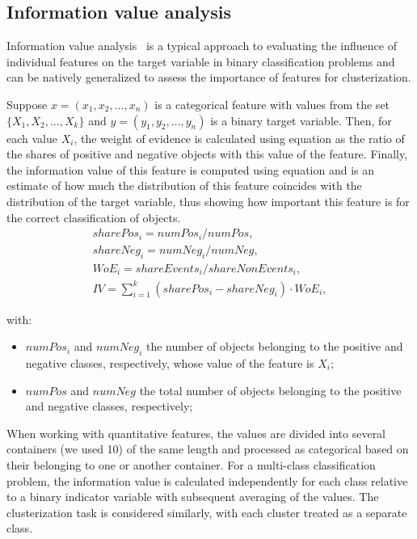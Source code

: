 \documentclass[10pt]{iopart}
\begin{document}
\subsection{Information value analysis}

Information value analysis~\cite{InformationValue} is a typical approach to evaluating the influence of individual features on the target variable in binary classification problems and can be natively generalized to assess the importance of features for clusterization.

Suppose $x=(x_1, x_2, \ldots, x_n)$ is a categorical feature with values from the set $\{ X_1, X_2, \ldots, X_k \}$ and $y=(y_1, y_2, \ldots, y_n)$ is a binary target variable. Then, for each value $X_i$, the weight of evidence is calculated using equation  as the ratio of the shares of positive and negative objects with this value of the feature. Finally, the information value of this feature is computed using equation  and is an estimate of how much the distribution of this feature coincides with the distribution of the target variable, thus showing how important this feature is for the correct classification of objects.
\begin{eqnarray}
    sharePos_i = numPos_i / numPos, \nonumber\\
    shareNeg_i = numNeg_i / numNeg, \nonumber\\
    WoE_i = shareEvents_i / shareNonEvents_i, \label{eq2}\\
    IV = \sum_{i = 1}^{k} (sharePos_i - shareNeg_i) \cdot WoE_i, \label{eq3}
\end{eqnarray}

with:
\begin{itemize}
    \item
        $numPos_i$ and $numNeg_i$ the number of objects belonging to the positive and negative classes, respectively, whose value of the feature is $X_i$;
    \item
        $numPos$ and $numNeg$ the total number of objects belonging to the positive and negative classes, respectively;
\end{itemize}

When working with quantitative features, the values are divided into several containers (we used 10) of the same length and processed as categorical based on their belonging to one or another container. For a multi-class classification problem, the information value is calculated independently for each class relative to a binary indicator variable with subsequent averaging of the values. The clusterization task is considered similarly, with each cluster treated as a separate class.
\end{document}
